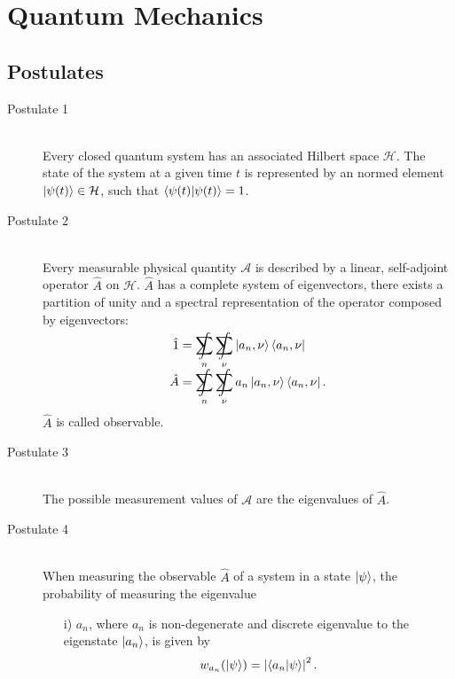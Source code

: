 \section{Quantum Mechanics}
	\subsection{Postulates}
		\begin{description}
			\item[Postulate 1]\hfill \\
				Every closed quantum system has an associated Hilbert space $\mathcal{H}$. The state of the system at a given time $t$ is represented by an normed element $\Ket{\psi(t)} \in \mathcal{H}$, such that $\braket{\psi(t)|\psi(t)} = 1$.
			\item[Postulate 2]\hfill \\
				Every measurable physical quantity $\mathcal{A}$ is described by a linear, self-adjoint operator $\hat{A}$ on $\mathcal{H}$.
				$\hat{A}$ has a complete system of eigenvectors, \ie there exists a partition of unity and a spectral representation of the operator composed by eigenvectors:
				\begin{equation}
					\begin{aligned}
						\hat{1} &= \SumInt_n \SumInt_\nu \Ket{a_n,\nu}\Bra{a_n,\nu} \\
						\hat{A} &= \SumInt_n \SumInt_\nu a_n\Ket{a_n,\nu}\Bra{a_n,\nu}. \\
					\end{aligned}
				\end{equation}
				$\hat{A}$ is called observable.
			\item[Postulate 3]\hfill \\
				The possible measurement values of $\mathcal{A}$ are the eigenvalues of $\hat{A}$.
			\item[Postulate 4]\hfill \\
				When measuring the observable $\hat{A}$ of a system in a state $\Ket{\psi}$, the probability of measuring the eigenvalue
				\begin{itemize}
					\item[i)] $a_n$, where $a_n$ is non-degenerate and discrete eigenvalue to the eigenstate $\Ket{a_n}$, is given by
						\begin{equation}
							w_{a_n}(\Ket{\psi}) = \left| \braket{a_n|\psi} \right|^2.
						\end{equation}

\end{itemize}
\end{description}
